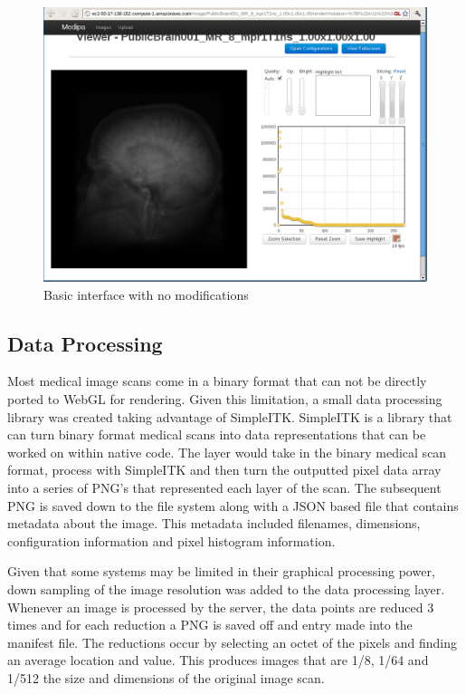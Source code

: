 \documentclass[annual]{acmsiggraph}
\begin{document}
\begin{figure}[htb]
	\includegraphics[scale=0.475]{clean_interface.png}
	\caption{\label{fig:head}Basic interface with no modifications}
\end{figure}

\subsection{Data Processing}

Most medical image scans come in a binary format that can not be directly ported to WebGL for rendering.  Given this limitation, a small data processing library was created taking advantage of SimpleITK.  SimpleITK is a library that can turn binary format medical scans into data representations that can be worked on within native code.  The layer would take in the binary medical scan format, process with SimpleITK and then turn the outputted pixel data array into a series of PNG's that represented each layer of the scan.  The subsequent PNG is saved down to the file system along with a JSON based file that contains metadata about the image.  This metadata included filenames, dimensions, configuration information and pixel histogram information.

Given that some systems may be limited in their graphical processing power, down sampling of the image resolution was added to the data processing layer.  Whenever an image is processed by the server, the data points are reduced 3 times and for each reduction a PNG is saved off and entry made into the manifest file.  The reductions occur by selecting an octet of the pixels and finding an average location and value.  This produces images that are 1/8, 1/64 and 1/512 the size and dimensions of the original image scan.
\end{document}
